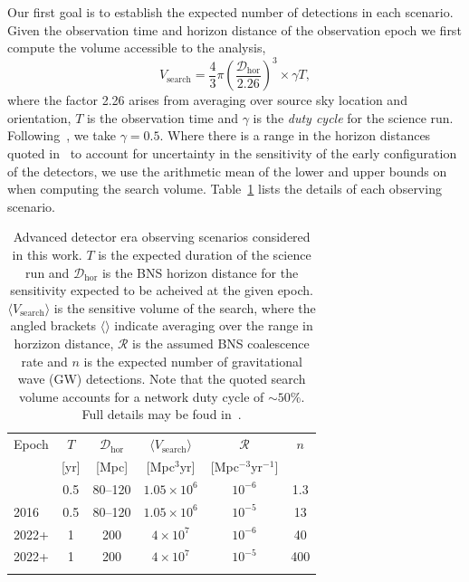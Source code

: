 \documentclass[twocolumn,nofootinbib]{revtex4-1}
\newcommand{\cbcrate}{{{\mathcal R}}}
\newcommand{\dhor}{{\mathcal D}_{\mathrm{hor}}}
\def\gw#1{gravitational wave#1 (GW#1)\gdef\gw{GW}}
\begin{document}
Our first goal is to establish the expected number of detections in each
scenario. Given the observation time and horizon distance of the observation
epoch we first compute the volume accessible to the analysis,
%
\begin{equation}
    \label{eq:search_volume}
    V_{\mathrm{search}} = \frac{4}{3}\pi \left(\frac{\dhor}{2.26}\right)^3 \times \gamma T,
\end{equation}
%
where the factor 2.26 arises from averaging over source sky location and
orientation, $T$ is the observation time and $\gamma$ is the \emph{duty cycle}
for the science run.  Following~\cite{ade_prospects}, we take $\gamma=0.5$.
Where there is a range in the horizon distances quoted in~\cite{ade_prospects}
to account for uncertainty in the sensitivity of the early configuration of the
detectors, we use the arithmetic mean of the lower and upper bounds on when
computing the search volume. Table~\ref{table:scenarios} lists the details of
each observing scenario.


\begin{table}
\centering
\begin{tabular}{l c c c c c }
\toprule
Epoch & $T$ & $\dhor$ &
$\langle V_{\mathrm{search}}\rangle$ & $\cbcrate$ & $n$ \\
 & [yr] & [Mpc] & [Mpc$^3$yr] &  [Mpc$^{-3}$yr$^{-1}$] \\
\colrule
2016 & 0.5 & 80--120 & $1.05\times10^6$ & $10^{-6}$ & 1.3 \\
2016 & 0.5 & 80--120 & $1.05\times10^6$ & $10^{-5}$ & 13 \\
2022+ & 1 & 200 & $4\times10^7$ & $10^{-6}$ & 40 \\
2022+ & 1 & 200 & $4\times10^7$ & $10^{-5}$ & 400 \\
\botrule
\end{tabular}
\caption{Advanced detector era observing scenarios considered in this work.  $T$
is the expected duration of the science run and $\dhor$ is the BNS
horizon distance for the sensitivity expected to be acheived at the given epoch.
$\langle V_{\mathrm{search}}\rangle $ is the sensitive volume of the search,
where the angled brackets $\langle \rangle$ indicate averaging over the range
in horzizon distance, $\cbcrate$ is the assumed BNS coalescence rate and
$n$ is the expected number of \gw{} detections.  Note that the
quoted search volume accounts for a network duty cycle of $\sim 50\%$.
Full details may be foud in~\cite{ade_prospects}.\label{table:scenarios}}
\end{table}
%
\end{document}
